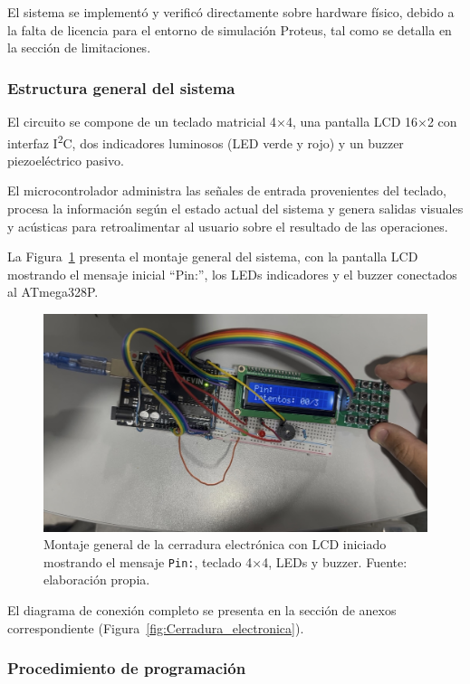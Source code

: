 El sistema se implementó y verificó directamente sobre hardware físico, 
debido a la falta de licencia para el entorno de simulación Proteus, tal como se detalla en la sección de limitaciones. 

\subsubsection{Estructura general del sistema}

El circuito se compone de un teclado matricial 4×4, una pantalla LCD 16×2 con interfaz I\textsuperscript{2}C, 
dos indicadores luminosos (LED verde y rojo) y un buzzer piezoeléctrico pasivo. 

El microcontrolador administra las señales de entrada provenientes del teclado, 
procesa la información según el estado actual del sistema y genera salidas visuales y acústicas 
para retroalimentar al usuario sobre el resultado de las operaciones.

La Figura~\ref{fig:cerradura_inicio} presenta el montaje general del sistema, 
con la pantalla LCD mostrando el mensaje inicial “Pin:”, los LEDs indicadores y el buzzer conectados al ATmega328P.  

\begin{figure}[H]
    \centering
    \includegraphics[width=0.8\columnwidth]{Anexos/Cerradura_Inicializada.png}
    \caption{Montaje general de la cerradura electrónica con LCD iniciado mostrando el mensaje \texttt{Pin:}, teclado 4×4, LEDs y buzzer. Fuente: elaboración propia.}
    \label{fig:cerradura_inicio}
\end{figure}

El diagrama de conexión completo se presenta en la sección de anexos correspondiente (Figura~\ref{fig:Cerradura_electronica}).

\subsubsection{Procedimiento de programación}


